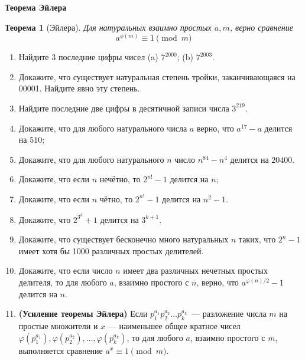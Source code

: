 \documentclass{article}
\newtheorem{theorem}{Теорема}
\begin{document}
\large
	
\begin{center}
	\textbf{Теорема Эйлера}
\end{center}

\begin{theorem}[Эйлера]
	Для натуральных взаимно простых $a, m$, верно сравнение $$a^{\phi(m)} \equiv 1 \pmod m$$
\end{theorem}

\begin{enumerate}[label*=\protect\fbox{\arabic{enumi}}]

\item Найдите $3$ последние цифры чисел (a) $7^{2000}$; (b) $7^{2003}$.

\item Докажите, что существует натуральная степень тройки, заканчивающаяся на 00001. Найдите явно эту степень.

\item Найдите последние две цифры в десятичной записи числа $3^{219}$.

\item Докажите, что для любого натурального числа $a$ верно, что $a^{17} - a$ делится на $510$;

\item Докажите, что для любого натурального $n$ число $n^{84} - n^4$ делится на $20400$.

\item Докажите, что если $n$ нечётно, то $2^{n!} - 1$ делится на $n$;

\item Докажите, что если $n$ чётно, то $2^{n!} - 1$ делится на $n^2 - 1$. 

\item Докажите, что $2^{3^k} + 1$ делится на $3^{k + 1}$.

\item Докажите, что существует бесконечно много натуральных $n$ таких, что $2^n - 1$ имеет хотя бы 1000 различных простых делителей.

\item Докажите, что если число $n$ имеет два различных нечетных простых делителя, то для любого $a$, взаимно простого с $n$, верно, что $a^{\varphi(n) / 2} - 1$ делится на $n$.

\item \textbf{(Усиление теоремы Эйлера)} Если $p_1^{a_1}p_2^{a_2}\ldots p_k^{a_k}$~--- разложение числа $m$ на простые множители и $x$ --- наименьшее общее кратное чисел $\varphi(p_1^{a_1}), \varphi(p_2^{a_2}),\ldots, \varphi(p_k^{a_k})$, то для любого $a$, взаимно простого с $m$, выполняется сравнение $a^x \equiv 1\pmod m$.


\end{enumerate}
\end{document}
